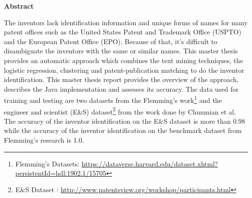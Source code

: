 \thispagestyle{empty}

\centerline{\Large{\textbf{Abstract}}}

\vspace{2cm}

The inventors lack identification information and unique forms of names for many patent offices such as the United States Patent and Trademark Office (USPTO) and the European Patent Office (EPO). Because of that, it's difficult to disambiguate the inventors with the same or similar names. This master thesis provides an automatic approach which combines the text mining techniques, the logistic regression, clustering and patent-publication matching to do the inventor identification. This master thesis report provides  the overview of the approach, describes the Java implementation and assesses its accuracy. The data used for training and testing  are two datasets from the Flemming's work\footnote{Flemming's Datasets: \url{https://dataverse.harvard.edu/dataset.xhtml? persistentId=hdl:1902.1/15705}}  and the engineer and scientist (E\&S) dataset\footnote{E\&S Dataset : \url{http://www.patentsview.org/workshop/participants.html}} from the work done by Chunmian et al. The accuracy of the inventor identification on the E\&S dataset is more than 0.98 while the accuracy of the inventor identification on the benchmark dataset from Flemming's research is 1.0.





\newpage
\thispagestyle{empty}
\rule{0cm}{5cm}